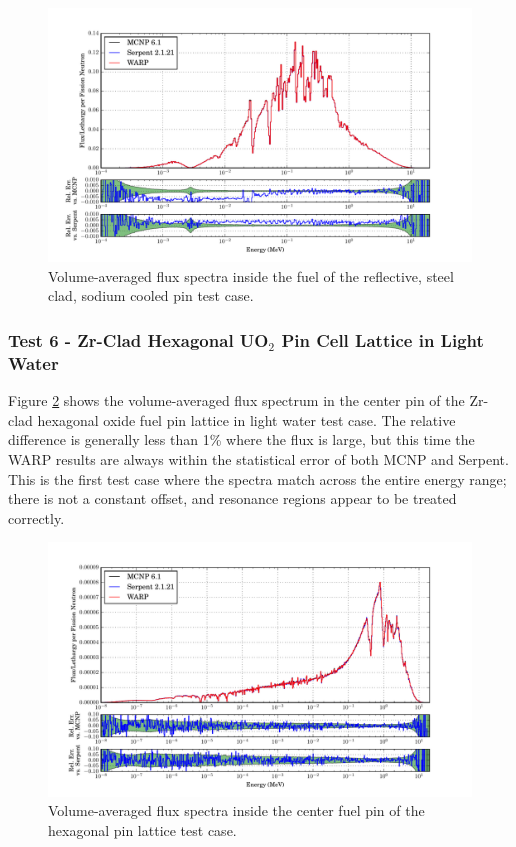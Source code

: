 \documentclass[preprint,12pt]{elsarticle}
\begin{document}
\begin{figure}[h!]
\centering
\includegraphics[width=\textwidth,trim= 1cm 0cm 1cm 0cm]{graphics/sodiumpin_spec.pdf}
\caption{Volume-averaged flux spectra inside the fuel of the reflective, steel clad, sodium cooled pin test case. \label{sodiumpin_spec} }
\end{figure}


\newpage
\subsubsection{Test 6 - Zr-Clad Hexagonal UO$_2$ Pin Cell Lattice in Light Water}

Figure \ref{assembly-lw_spec} shows the volume-averaged flux spectrum in the center pin of the Zr-clad hexagonal oxide fuel pin lattice in light water test case. The relative difference is generally less than 1\% where the flux is large, but this time the WARP results are always within the statistical error of both MCNP and Serpent. This is the first test case where the spectra match across the entire energy range; there is not a constant offset, and resonance regions appear to be treated correctly.  

\begin{figure}[h!]
\centering
\includegraphics[width=\textwidth,trim= 1cm 0cm 1cm 0cm]{graphics/assembly-lw_spec.pdf}
\caption{Volume-averaged flux spectra inside the center fuel pin of the hexagonal pin lattice test case. \label{assembly-lw_spec} }
\end{figure}
\end{document}
